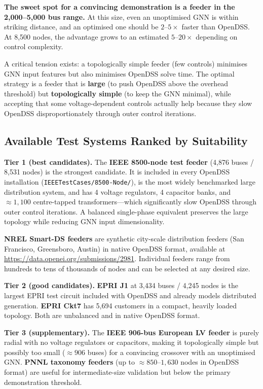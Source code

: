 \documentclass[11pt]{article}
\begin{document}
\noindent\textbf{The sweet spot for a convincing demonstration is a feeder
in the 2,000--5,000 bus range.}  At this size, even an unoptimised GNN is
within striking distance, and an optimised one should be $2$--$5\times$
faster than OpenDSS.  At 8,500 nodes, the advantage grows to an estimated
$5$--$20\times$ depending on control complexity.

A critical tension exists: a topologically simple feeder (few controls)
minimises GNN input features but also minimises OpenDSS solve time.
The optimal strategy is a feeder that is \textbf{large} (to push OpenDSS
above the overhead threshold) but \textbf{topologically simple} (to keep
the GNN minimal), while accepting that some voltage-dependent controls
actually help because they slow OpenDSS disproportionately through outer
control iterations.

\subsection{Available Test Systems Ranked by Suitability}

\textbf{Tier 1 (best candidates).}
The \textbf{IEEE 8500-node test feeder} (4,876 buses / 8,531 nodes) is
the strongest candidate.  It is included in every OpenDSS installation
(\texttt{IEEETestCases/8500-Node/}), is the most widely benchmarked large
distribution system, and has 4 voltage regulators, 4 capacitor banks, and
${\approx}1{,}100$ centre-tapped transformers---which significantly slow
OpenDSS through outer control iterations.  A balanced single-phase
equivalent preserves the large topology while reducing GNN input
dimensionality.

\textbf{NREL Smart-DS feeders} are synthetic city-scale distribution
feeders (San Francisco, Greensboro, Austin) in native OpenDSS format,
available at \url{https://data.openei.org/submissions/2981}.  Individual
feeders range from hundreds to tens of thousands of nodes and can be
selected at any desired size.

\textbf{Tier 2 (good candidates).}
\textbf{EPRI J1} at 3,434 buses / 4,245 nodes is the largest EPRI test
circuit included with OpenDSS and already models distributed generation.
\textbf{EPRI Ckt7} has 5,694 customers in a compact, heavily loaded
topology.  Both are unbalanced and in native OpenDSS format.

\textbf{Tier 3 (supplementary).}
The \textbf{IEEE 906-bus European LV feeder} is purely radial with no
voltage regulators or capacitors, making it topologically simple but
possibly too small (${\approx}906$ buses) for a convincing crossover with
an unoptimised GNN.
\textbf{PNNL taxonomy feeders} (up to ${\approx}850$--$1{,}630$ nodes in
OpenDSS format) are useful for intermediate-size validation but below the
primary demonstration threshold.
\end{document}

